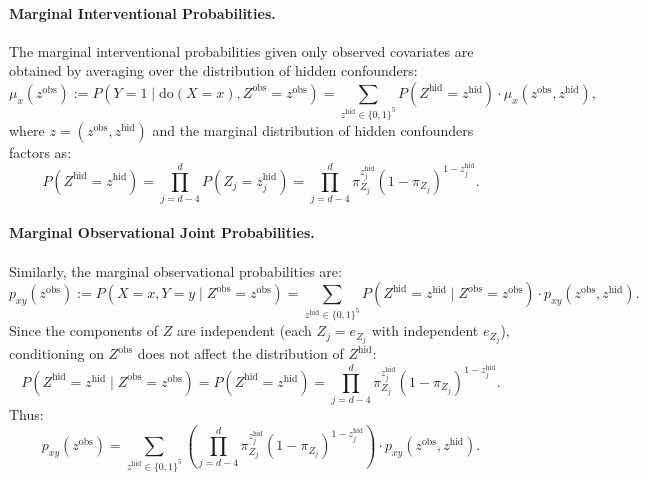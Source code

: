\documentclass[accepted]{uai2026} %
\theoremstyle{plain}
\theoremstyle{definition}
\theoremstyle{remark}
\begin{document}
\paragraph{Marginal Interventional Probabilities.}
The marginal interventional probabilities given only observed covariates are obtained by averaging over the distribution of hidden confounders:
\begin{equation}
\mu_x(z^{\text{obs}}) := P(Y = 1 \mid \text{do}(X = x), Z^{\text{obs}} = z^{\text{obs}}) = \sum_{z^{\text{hid}} \in \{0,1\}^5} P(Z^{\text{hid}} = z^{\text{hid}}) \cdot \mu_x(z^{\text{obs}}, z^{\text{hid}}),
\end{equation}
where $z = (z^{\text{obs}}, z^{\text{hid}})$ and the marginal distribution of hidden confounders factors as:
\begin{equation}
P(Z^{\text{hid}} = z^{\text{hid}}) = \prod_{j=d-4}^{d} P(Z_j = z_j^{\text{hid}}) = \prod_{j=d-4}^{d} \pi_{Z_j}^{z_j^{\text{hid}}} (1 - \pi_{Z_j})^{1 - z_j^{\text{hid}}}.
\end{equation}

\paragraph{Marginal Observational Joint Probabilities.}
Similarly, the marginal observational probabilities are:
\begin{equation}
p_{xy}(z^{\text{obs}}) := P(X = x, Y = y \mid Z^{\text{obs}} = z^{\text{obs}}) = \sum_{z^{\text{hid}} \in \{0,1\}^5} P(Z^{\text{hid}} = z^{\text{hid}} \mid Z^{\text{obs}} = z^{\text{obs}}) \cdot p_{xy}(z^{\text{obs}}, z^{\text{hid}}).
\end{equation}
Since the components of $Z$ are independent (each $Z_j = e_{Z_j}$ with independent $e_{Z_j}$), conditioning on $Z^{\text{obs}}$ does not affect the distribution of $Z^{\text{hid}}$:
\begin{equation}
P(Z^{\text{hid}} = z^{\text{hid}} \mid Z^{\text{obs}} = z^{\text{obs}}) = P(Z^{\text{hid}} = z^{\text{hid}}) = \prod_{j=d-4}^{d} \pi_{Z_j}^{z_j^{\text{hid}}} (1 - \pi_{Z_j})^{1 - z_j^{\text{hid}}}.
\end{equation}
Thus:
\begin{equation}
p_{xy}(z^{\text{obs}}) = \sum_{z^{\text{hid}} \in \{0,1\}^5} \left(\prod_{j=d-4}^{d} \pi_{Z_j}^{z_j^{\text{hid}}} (1 - \pi_{Z_j})^{1 - z_j^{\text{hid}}}\right) \cdot p_{xy}(z^{\text{obs}}, z^{\text{hid}}).
\end{equation}
\end{document}
